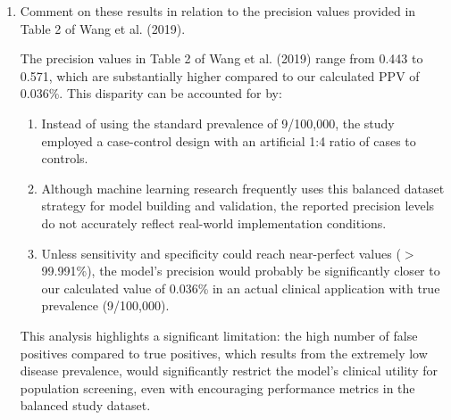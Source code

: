 \documentclass[a4paper]{article}
\newenvironment{soln}{
    \leavevmode\color{blue}\ignorespaces
}{}
\begin{document}
\begin{enumerate}
\begin{soln}
        Therefore, sensitivity = specificity must be approximately 99.991\%.
    \end{soln}
    \item Comment on these results in relation to the precision values provided in Table 2 of Wang et al. (2019).\\
    \begin{soln}
        The precision values in Table 2 of Wang et al. (2019) range from 0.443 to 0.571, which are substantially higher compared to our calculated PPV of 0.036\%. This disparity can be accounted for by:
        
        \begin{enumerate}
            \item Instead of using the standard prevalence of 9/100,000, the study employed a case-control design with an artificial 1:4 ratio of cases to controls.
            \item Although machine learning research frequently uses this balanced dataset strategy for model building and validation, the reported precision levels do not accurately reflect real-world implementation conditions.
            \item Unless sensitivity and specificity could reach near-perfect values ($>$99.991\%), the model's precision would probably be significantly closer to our calculated value of 0.036\% in an actual clinical application with true prevalence (9/100,000).
        \end{enumerate}
        
        This analysis highlights a significant limitation: the high number of false positives compared to true positives, which results from the extremely low disease prevalence, would significantly restrict the model's clinical utility for population screening, even with encouraging performance metrics in the balanced study dataset.
    \end{soln}
\end{enumerate}
\end{document}
